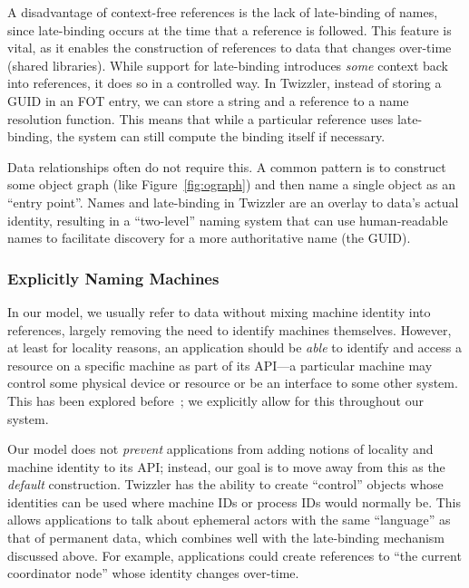     A disadvantage of context-free references is the lack of late-binding of names,
    since late-binding occurs at the time that a reference is followed. This feature
    is vital, as it enables the construction of references to data that changes
    over-time (\eg shared libraries). While support for late-binding
    introduces \emph{some} context back into references, it does so in a controlled way. In Twizzler,
    instead of storing a GUID in an FOT entry, we can store a string and a reference
    to a name resolution function.
    This means
    that while a particular reference uses late-binding, the system can still compute the binding itself
    if necessary.

    Data relationships often do not require this.
    A common pattern is to construct some object graph (like
    Figure~\ref{fig:ograph}) and then name a single object as an ``entry point''.
    Names and late-binding in Twizzler are an overlay to data's actual
    identity, resulting in a ``two-level'' naming system that can use human-readable names to facilitate
    discovery for a more authoritative name (the GUID).




    \subsubsection{Explicitly Naming Machines}
    \label{sec:name_machines}

    In our model, we usually refer to data without mixing machine identity into references,
    largely removing the need to identify machines themselves.
    However, at least for locality reasons,
    an application should be \emph{able} to identify and access a resource on a
    specific machine as part of its API---a particular
    machine may control some physical device or resource or be an interface to some other system. This
    has been explored before~\cite{ousterhout:computer88,grapevine}; we explicitly allow for this
    throughout our system.

    Our model does not \emph{prevent} applications from adding notions of locality and
    machine identity to its API; instead, our goal is to move away from this as the \emph{default}
    construction.
    Twizzler has the ability to create ``control'' objects whose identities can be used
    where machine IDs or process IDs would normally be. This allows applications to talk about ephemeral
    actors with the same ``language'' as that of permanent data, which combines well with the
    late-binding mechanism discussed above. For example, applications could create references to ``the
    current coordinator node'' whose identity changes over-time.

